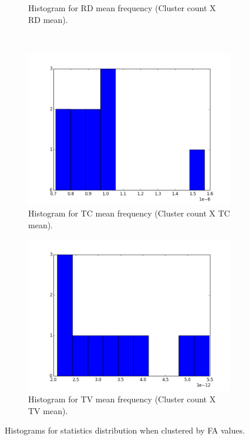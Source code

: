 \documentclass[a4paper,11pt]{report}
\begin{document}
\begin{figure}[!ht]
\begin{subfigure}[t]{.49\textwidth}
        \caption{Histogram for RD mean frequency (Cluster count X RD mean).}
        \label{subfig:fa_hist_rd}
      \end{subfigure}\hfill\\
      \begin{subfigure}[t]{.49\textwidth}
        \includegraphics[width=1\linewidth]{img/histograms/fa_clustered_fa_mask_tc_means_hist.png}
        \caption{Histogram for TC mean frequency (Cluster count X TC mean).}
        \label{subfig:fa_hist_tc}
      \end{subfigure}\hfill%
      \begin{subfigure}[t]{.49\textwidth}
        \includegraphics[width=1\linewidth]{img/histograms/fa_clustered_fa_mask_tv_means_hist.png}
        \caption{Histogram for TV mean frequency (Cluster count X TV mean).}
        \label{subfig:fa_hist_tv}
      \end{subfigure}\hfill

      \caption{Histograms for statistics distribution when clustered by FA values.}
      \label{fig:fa-histograms}
    \end{figure}
\end{document}
